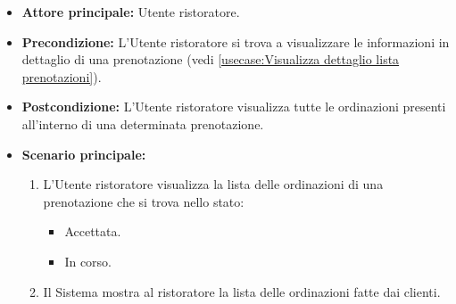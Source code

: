 \label{usecase:Visualizzazione lista ordinazioni}
\begin{itemize}
	\item \textbf{Attore principale:} Utente ristoratore.

	\item \textbf{Precondizione:} L'Utente ristoratore si trova a visualizzare le informazioni in dettaglio di una prenotazione (vedi \autoref{usecase:Visualizza dettaglio lista prenotazioni}).

	\item \textbf{Postcondizione:} L'Utente ristoratore visualizza tutte le ordinazioni presenti all'interno di una determinata prenotazione.

	\item \textbf{Scenario principale:}
	      \begin{enumerate}
		      \item L'Utente ristoratore visualizza la lista delle ordinazioni di una prenotazione che si trova nello stato:
			  \begin{itemize}
				\item Accettata.
				\item In corso.
			  \end{itemize}
		      \item Il Sistema mostra al ristoratore la lista delle ordinazioni fatte dai clienti.
	      \end{enumerate}
\end{itemize}
